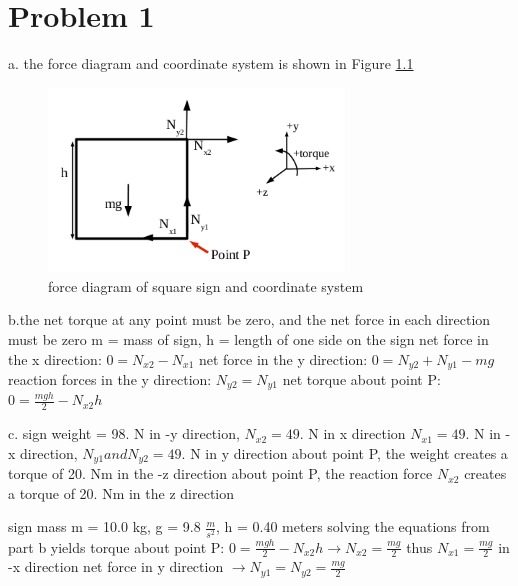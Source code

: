 \chapter{Problem 1}
\label{Problem 1}
a. the force diagram and coordinate system is shown in Figure \ref{fig:forceDiagram}\newline

\begin{figure}[h]
	\centering
	\includegraphics[width=0.7\textwidth]{figures/exam4problem1partA.png}
	\caption{force diagram of square sign and coordinate system}
	\label{fig:forceDiagram}
\end{figure}

b.the net torque at any point must be zero, and the net force in each direction must be zero \newline
m = mass of sign, h = length of one side on the sign\newline
net force in the x direction: $0 = N_{x2} - N_{x1}$\newline
net force in the y direction: $0 = N_{y2} + N_{y1} - mg$\newline
reaction forces in the y direction: $N_{y2} = N_{y1}$\newline
net torque about point P: $0 = \frac{mgh}{2} - N_{x2}h$\newline

c. sign weight = 98. N in -y direction, $N_{x2} = 49.$ N in x direction\newline
$N_{x1} = 49.$ N in -x direction, $N_{y1} and N_{y2} = 49.$ N in y direction\newline
about point P, the weight creates a torque of 20. Nm in the -z direction\newline
about point P, the reaction force $N_{x2}$ creates a torque of 20. Nm in the z direction\newline

sign mass m = 10.0 kg, g = 9.8 $\frac{m}{s^{2}}$, h = 0.40 meters\newline
solving the equations from part b yields\newline
torque about point P: $0 = \frac{mgh}{2} - N_{x2}h \rightarrow N_{x2} = \frac{mg}{2}$\newline
thus $N_{x1} = \frac{mg}{2}$ in -x direction\newline
net force in y direction $\rightarrow N_{y1} = N_{y2} = \frac{mg}{2}$
